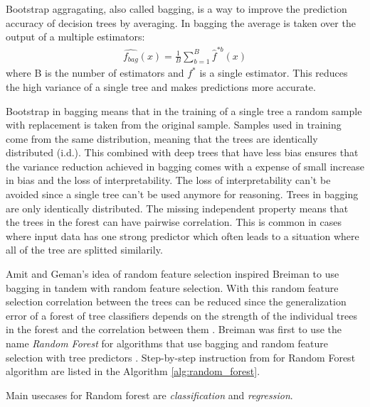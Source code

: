 Bootstrap aggragating, also called bagging, is a way to improve the prediction accuracy of decision trees by averaging. In bagging the  average is taken over the output of a multiple estimators:
\begin{align}
    \hat {f_{bag}}(x) = \frac{1}{B}\sum_{b = 1}^{B} \hat {f}^{*b}(x)
\end{align}
where B is the number of estimators and ${f}^{*}$ is a single estimator. This reduces the high variance of a single tree and makes predictions more accurate.

Bootstrap in bagging means that in the training of a single tree a random sample with replacement is taken from the original sample. Samples used in training come from the same distribution, meaning that the trees are identically distributed (i.d.). This combined with deep trees that have less bias ensures that the variance reduction achieved in bagging comes with a expense of small increase in bias and the loss of interpretability. The loss of interpretability can't be avoided since a single tree can't be used anymore for reasoning. Trees in bagging are only identically distributed. The missing independent property means that the trees in the forest can have pairwise correlation. This is common in cases where input data has one strong predictor which often leads to a situation where all of the tree are splitted similarily. \cite{friedman2001elements}

Amit and Geman's \cite{amit1997shape} idea of random feature selection inspired Breiman to use bagging in tandem with random feature selection. With this random feature selection correlation between the trees can be reduced since the generalization error of a forest of tree classifiers depends on the strength of the individual trees in the forest and the correlation between them \cite{breiman2001random}. Breiman was first to use the name \textit{Random Forest} for algorithms that use bagging and random feature selection with tree predictors \cite{breiman2001random}. Step-by-step instruction from \cite{friedman2001elements} for Random Forest algorithm are listed in the Algorithm \ref{alg:random_forest}.

Main usecases for Random forest are \textit{classification} and \textit{regression}.

